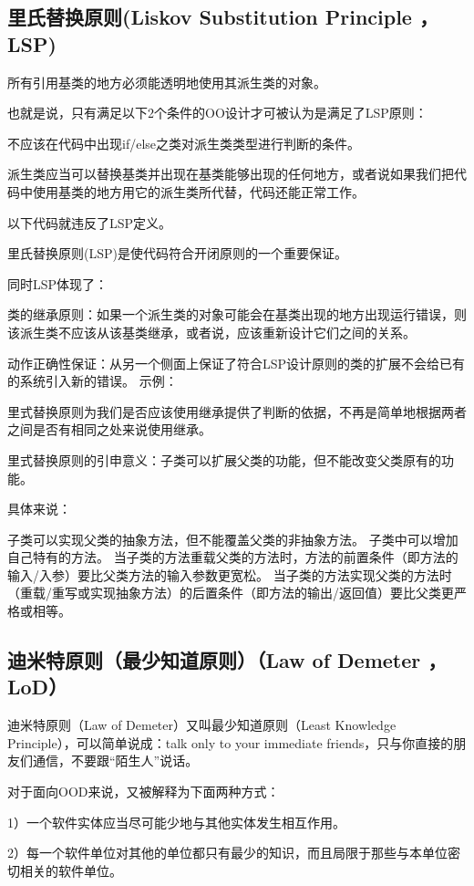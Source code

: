 \subsection{里氏替换原则(Liskov Substitution Principle ，LSP)}
所有引用基类的地方必须能透明地使用其派生类的对象。

也就是说，只有满足以下2个条件的OO设计才可被认为是满足了LSP原则：

不应该在代码中出现if/else之类对派生类类型进行判断的条件。

派生类应当可以替换基类并出现在基类能够出现的任何地方，或者说如果我们把代码中使用基类的地方用它的派生类所代替，代码还能正常工作。

以下代码就违反了LSP定义。


里氏替换原则(LSP)是使代码符合开闭原则的一个重要保证。

同时LSP体现了：

类的继承原则：如果一个派生类的对象可能会在基类出现的地方出现运行错误，则该派生类不应该从该基类继承，或者说，应该重新设计它们之间的关系。

动作正确性保证：从另一个侧面上保证了符合LSP设计原则的类的扩展不会给已有的系统引入新的错误。
示例：

里式替换原则为我们是否应该使用继承提供了判断的依据，不再是简单地根据两者之间是否有相同之处来说使用继承。

里式替换原则的引申意义：子类可以扩展父类的功能，但不能改变父类原有的功能。

具体来说：

子类可以实现父类的抽象方法，但不能覆盖父类的非抽象方法。
子类中可以增加自己特有的方法。
当子类的方法重载父类的方法时，方法的前置条件（即方法的输入/入参）要比父类方法的输入参数更宽松。
当子类的方法实现父类的方法时（重载/重写或实现抽象方法）的后置条件（即方法的输出/返回值）要比父类更严格或相等。

\subsection{迪米特原则（最少知道原则）（Law of Demeter ，LoD）}

迪米特原则（Law of Demeter）又叫最少知道原则（Least Knowledge Principle），可以简单说成：talk only to your immediate friends，只与你直接的朋友们通信，不要跟“陌生人”说话。

对于面向OOD来说，又被解释为下面两种方式：

1）一个软件实体应当尽可能少地与其他实体发生相互作用。

2）每一个软件单位对其他的单位都只有最少的知识，而且局限于那些与本单位密切相关的软件单位。

